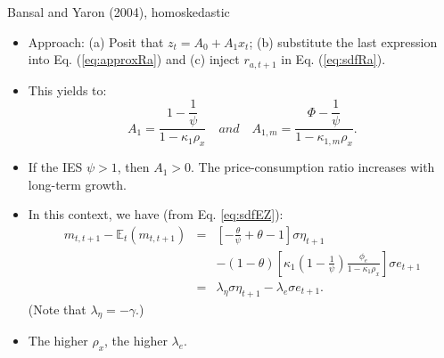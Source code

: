 \begin{frame}{Bansal and Yaron (2004), homoskedastic}
\begin{footnotesize}
\begin{itemize}
	\item Approach: (a) Posit that $z_t = A_0 + A_1 x_t$; (b) substitute the last expression into Eq. (\ref{eq:approxRa}) and (c) inject $r_{a,t+1}$ in Eq. (\ref{eq:sdfRa}).
	\item This yields to:
	\begin{equation}\label{eq:solABY1}
	A_1 = \frac{1- \dfrac{1}{\psi}}{1 - \kappa_1 \rho_x} \quad and \quad A_{1,m} = \frac{\Phi- \dfrac{1}{\psi}}{1 - \kappa_{1,m} \rho_x}.
	\end{equation}
	\item If the IES $\psi > 1$, then $A_1 > 0$. The price-consumption ratio increases with long-term growth.
	\item In this context, we have (from Eq. \ref{eq:sdfEZ}):
	\begin{eqnarray}\label{eq:mBY1}
	m_{t,t+1} - \mathbb{E}_t(m_{t,t+1}) &=& \left[  - \frac{\theta}{\psi} + \theta - 1\right] \sigma \eta_{t+1} \nonumber\\
	&&- (1 - \theta)\left[ \kappa_1 \left( 1 - \frac{1}{\psi}\right) \frac{\phi_e}{1 - \kappa_1 \rho_x} \right]\sigma e_{t+1}\nonumber\\
	&=& \lambda_{\eta} \sigma \eta_{t+1} - \lambda_{e} \sigma e_{t+1}.
	\end{eqnarray}
	(Note that $\lambda_{\eta} = -\gamma$.)
	\item The higher $\rho_x$, the higher $\lambda_{e}$.
\end{itemize}
\end{footnotesize}
\end{frame}


